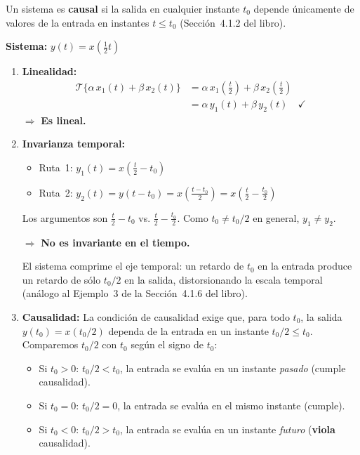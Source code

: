 \documentclass[10pt,a4paper]{article}
\begin{document}
	Un sistema es \textbf{causal} si la salida en cualquier instante $t_0$ depende únicamente de valores de la entrada en instantes $t \leq t_0$ (Sección~4.1.2 del libro).
	
	\textbf{Sistema:} $y(t) = x\!\left(\tfrac{1}{2}t\right)$
	
	\begin{enumerate}[label=\textbf{\alph*)}]
		\item \textbf{Linealidad:}
		\begin{align*}
		\mathcal{T}\{\alpha\,x_1(t) + \beta\,x_2(t)\} &= \alpha\,x_1\!\left(\tfrac{t}{2}\right) + \beta\,x_2\!\left(\tfrac{t}{2}\right) \\
		&= \alpha\,y_1(t) + \beta\,y_2(t) \quad \checkmark
		\end{align*}
		$\Rightarrow$ \textbf{Es lineal.}
		
		\item \textbf{Invarianza temporal:}
		\begin{itemize}
			\item Ruta~1: $y_1(t) = x\!\left(\tfrac{t}{2} - t_0\right)$
			\item Ruta~2: $y_2(t) = y(t-t_0) = x\!\left(\tfrac{t-t_0}{2}\right) = x\!\left(\tfrac{t}{2} - \tfrac{t_0}{2}\right)$
		\end{itemize}
		Los argumentos son $\tfrac{t}{2} - t_0$ vs. $\tfrac{t}{2} - \tfrac{t_0}{2}$. Como $t_0 \neq t_0/2$ en general, $y_1 \neq y_2$.
		
		$\Rightarrow$ \textbf{No es invariante en el tiempo.}
		
		El sistema comprime el eje temporal: un retardo de $t_0$ en la entrada produce un retardo de sólo $t_0/2$ en la salida, distorsionando la escala temporal (análogo al Ejemplo~3 de la Sección~4.1.6 del libro).
		
		\item \textbf{Causalidad:} La condición de causalidad exige que, para todo $t_0$, la salida $y(t_0) = x(t_0/2)$ dependa de la entrada en un instante $t_0/2 \leq t_0$. Comparemos $t_0/2$ con $t_0$ según el signo de $t_0$:
		\begin{itemize}
			\item Si $t_0 > 0$: $t_0/2 < t_0$, la entrada se evalúa en un instante \textit{pasado} (cumple causalidad).
			\item Si $t_0 = 0$: $t_0/2 = 0$, la entrada se evalúa en el mismo instante (cumple).
			\item Si $t_0 < 0$: $t_0/2 > t_0$, la entrada se evalúa en un instante \textit{futuro} (\textbf{viola} causalidad).
		\end{itemize}


\end{enumerate}
\end{document}
